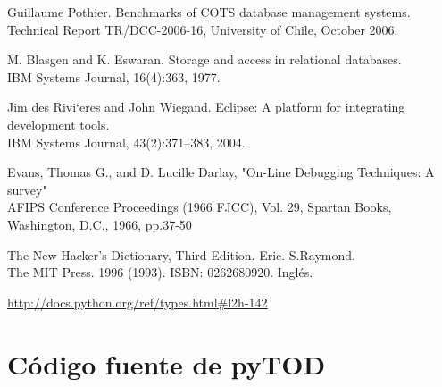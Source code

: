 \documentclass[12pt,legalpaper]{report}
\begin{document}
\begin{thebibliography}{30}
 Guillaume Pothier. Benchmarks of COTS database management systems. \\
Technical Report TR/DCC-2006-16, University of Chile, October 2006.

M. Blasgen and K. Eswaran. Storage and access in relational databases. \\
IBM Systems Journal, 16(4):363, 1977.

 Jim des Rivi`eres and John Wiegand. Eclipse: A platform for integrating development tools.\\
IBM Systems Journal, 43(2):371–383, 2004.

 Evans, Thomas G., and D. Lucille Darlay, "On-Line Debugging Techniques: A survey"\\
AFIPS Conference Proceedings (1966 FJCC), Vol. 29, Spartan Books, Washington, D.C., 1966, pp.37-50

 The New Hacker's Dictionary,  Third Edition. Eric. S.Raymond. \\
The MIT Press. 1996 (1993). ISBN: 0262680920. Inglés.

\href{http://docs.python.org/ref/types.html#l2h-142}{http://docs.python.org/ref/types.html\#l2h-142}

\end{thebibliography}

\appendix
\appendixpage
\addappheadtotoc
\pagebreak
\chapter{Código fuente de pyTOD}
\end{document}
